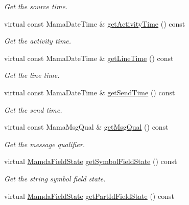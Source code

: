 \begin{CompactItemize}
\begin{CompactList}\small\item\em Get the source time. \item\end{CompactList}\item 
virtual const Mama\-Date\-Time \& \hyperlink{classWombat_1_1MamdaOrderBookConcreteSimpleDelta_83a181dbc82a58ab1c7bd3565780e7bd}{get\-Activity\-Time} () const 
\begin{CompactList}\small\item\em Get the activity time. \item\end{CompactList}\item 
virtual const Mama\-Date\-Time \& \hyperlink{classWombat_1_1MamdaOrderBookConcreteSimpleDelta_21b2f8800eceb76e80b9f1b445666681}{get\-Line\-Time} () const 
\begin{CompactList}\small\item\em Get the line time. \item\end{CompactList}\item 
virtual const Mama\-Date\-Time \& \hyperlink{classWombat_1_1MamdaOrderBookConcreteSimpleDelta_8df1e676c05ca64e009164354f2b68fb}{get\-Send\-Time} () const 
\begin{CompactList}\small\item\em Get the send time. \item\end{CompactList}\item 
virtual const Mama\-Msg\-Qual \& \hyperlink{classWombat_1_1MamdaOrderBookConcreteSimpleDelta_32a356426ef7b0ddf847983f13f30f94}{get\-Msg\-Qual} () const 
\begin{CompactList}\small\item\em Get the message qualifier. \item\end{CompactList}\item 
virtual \hyperlink{namespaceWombat_93aac974f2ab713554fd12a1fa3b7d2a}{Mamda\-Field\-State} \hyperlink{classWombat_1_1MamdaOrderBookConcreteSimpleDelta_0bad5acee355acc180354fc1029ebca4}{get\-Symbol\-Field\-State} () const 
\begin{CompactList}\small\item\em Get the string symbol field state. \item\end{CompactList}\item 
virtual \hyperlink{namespaceWombat_93aac974f2ab713554fd12a1fa3b7d2a}{Mamda\-Field\-State} \hyperlink{classWombat_1_1MamdaOrderBookConcreteSimpleDelta_4a217a14e0da5dba63b9cea51b53f513}{get\-Part\-Id\-Field\-State} () const 

\end{CompactItemize}
